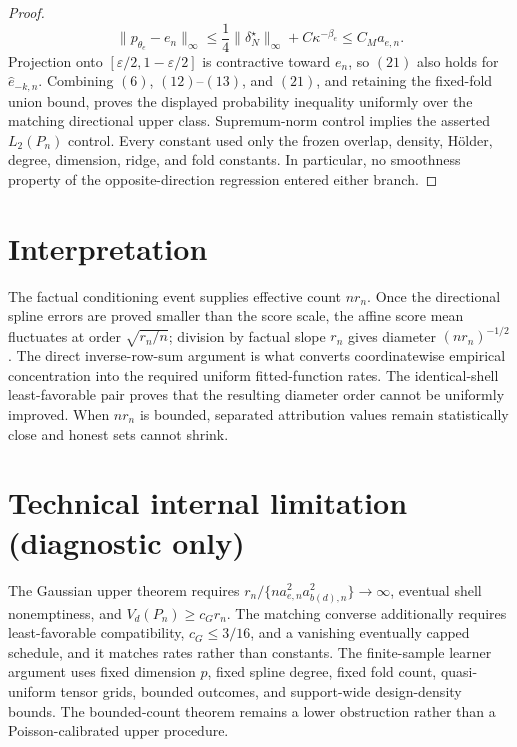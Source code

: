 \documentclass{article}
\begin{document}
\begin{proof}
\[\lVert p_{\widehat\theta_e}-e_n\rVert_\infty\le\frac14\lVert\delta_N^\star\rVert_\infty+C\kappa^{-\beta_e}\le C_Ma_{e,n}.\tag{21}\]
Projection onto \([\varepsilon/2,1-\varepsilon/2]\) is contractive toward \(e_n\), so \((21)\) also holds for \(\widehat e_{-k,n}\). Combining \((6)\), \((12)\)--\((13)\), and \((21)\), and retaining the fixed-fold union bound, proves the displayed probability inequality uniformly over the matching directional upper class. Supremum-norm control implies the asserted \(L_2(P_n)\) control. Every constant used only the frozen overlap, density, H\"older, degree, dimension, ridge, and fold constants. In particular, no smoothness property of the opposite-direction regression entered either branch.
\end{proof}

\section{Interpretation}

The factual conditioning event supplies effective count \(nr_n\). Once the directional spline errors are proved smaller than the score scale, the affine score mean fluctuates at order \(\sqrt{r_n/n}\); division by factual slope \(r_n\) gives diameter \((nr_n)^{-1/2}\). The direct inverse-row-sum argument is what converts coordinatewise empirical concentration into the required uniform fitted-function rates. The identical-shell least-favorable pair proves that the resulting diameter order cannot be uniformly improved. When \(nr_n\) is bounded, separated attribution values remain statistically close and honest sets cannot shrink.

\section*{Technical internal limitation (diagnostic only)}

The Gaussian upper theorem requires \(r_n/\{na_{e,n}^2a_{b(d),n}^2\}\to\infty\), eventual shell nonemptiness, and \(V_d(P_n)\ge c_Gr_n\). The matching converse additionally requires least-favorable compatibility, \(c_G\le3/16\), and a vanishing eventually capped schedule, and it matches rates rather than constants. The finite-sample learner argument uses fixed dimension \(p\), fixed spline degree, fixed fold count, quasi-uniform tensor grids, bounded outcomes, and support-wide design-density bounds. The bounded-count theorem remains a lower obstruction rather than a Poisson-calibrated upper procedure.
\end{document}
